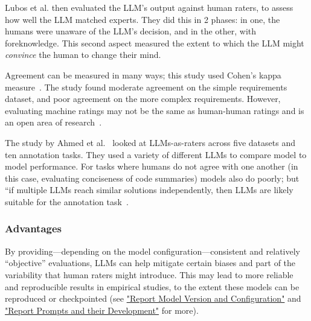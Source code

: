 Lubos et al. then evaluated the LLM's output against human raters, to assess how well the LLM matched experts. They did this in 2 phases: in one, the humans were unaware of the LLM's decision, and in the other, with foreknowledge. This second aspect measured the extent to which the LLM might \emph{convince} the human to change their mind. 

Agreement can be measured in many ways; this study used Cohen's kappa measure~\cite{cohen60}. The study found moderate agreement on the simple requirements dataset, and poor agreement on the more complex requirements. However, evaluating machine ratings may not be the same as human-human ratings and is an open area of research~\cite{DBLP:journals/corr/abs-2410-03775}. 

The study by Ahmed et al.~\cite{DBLP:journals/corr/abs-2408-05534} looked at LLMs-as-raters across five datasets and ten annotation tasks. They used a variety of different LLMs to compare model to model performance. For tasks where humans do not agree with one another (in this case, evaluating conciseness of code summaries) models also do poorly; but ``if multiple LLMs reach similar solutions independently, then LLMs are likely suitable for the annotation task~\cite[p.6]{DBLP:journals/corr/abs-2408-05534}.



\subsubsection{Advantages}

By providing---depending on the model configuration---consistent and relatively ``objective'' evaluations, LLMs can help mitigate certain biases and part of the variability that human raters might introduce. 
This may lead to more reliable and reproducible results in empirical studies, to the extent these models can be reproduced or checkpointed (see \href{/guidelines/#report-model-version-and-configuration}{"Report Model Version and Configuration"} and \href{/guidelines/#report-prompts-and-their-development}{"Report Prompts and their Development"} for more).

